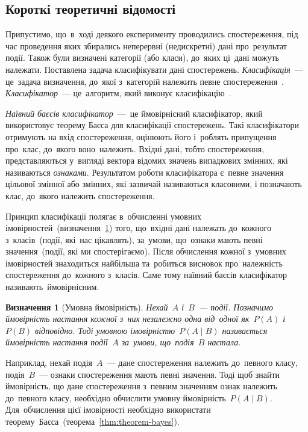 \documentclass[
	a4paper,
	oneside,
	DIV = 12,
	fontsize = 13pt,
	headings = normal,
	numbers = endperiod,
]{scrartcl}
\theoremstyle{mythm}
\newtheorem{mydef}{Визначення}
\begin{document}
		\subsection{Короткі теоретичні відомості}
			\label{ssec:theory-short}
			Припустимо, що~в~ході деякого експерименту проводились спостереження, під час проведення яких збирались неперервні (недискретні) дані про~результат події. Також були визначені категорії (або класи), до~яких ці~дані можуть належати. Поставлена задача класифікувати дані спостережень. \emph{Класифікація}~— це~задача визначення, до~якої з~категорій належить певне спостереження~\cite{wiki-stat-classification}. \emph{Класифікатор}~— це~алгоритм, який виконує класифікацію~\cite{wiki-stat-classification}.

			\emph{Наївний баєсів класифікатор}~— це ймовірнісний класифікатор, який використовує теорему Баєса для класифікації спостережень. Такі класифікатори отримують на вхід спостереження, оцінюють його і~роблять припущення про~клас, до~якого воно~належить. Вхідні дані, тобто спостереження, представляються у~вигляді вектора відомих значень випадкових змінних, які називаються \emph{ознаками}. Результатом роботи класифікатора є~певне значення цільової змінної або змінних, які зазвичай називаються класовими, і позначають клас, до~якого належить спостереження.

			Принцип класифікації полягає в~обчисленні умовних імовірностей~(визначення~\ref{def:conditional-probability}) того, що~вхідні дані належать до~кожного з~класів~(події, які~нас цікавлять), за~умови, що~ознаки мають певні значення~(події, які ми спостерігаємо). Після обчислення кожної з~умовних імовірностей знаходиться найбільша та~робиться висновок про~належність спостереження до~кожного з~класів. Саме тому наївний баєсів класифікатор називають~ймовірнісним.

			\begin{mydef}[Умовна ймовірність]
				\label{def:conditional-probability}
				Нехай~$A$ і~$B$~— події. Позначимо ймовірність настання кожної з~них незалежно одна від~одної як~$P(A)$ і~$P(B)$ відповідно. Тоді \emph{умовною імовірністю}~$P(A \mid B)$ називається ймовірність настання події~$A$ за~умови, що~подія~$B$ настала.
			\end{mydef}
			
			Наприклад, нехай подія~$A$~— дане спостереження належить до~певного класу, подія~$B$~— ознаки спостереження мають певні значення. Тоді щоб знайти ймовірність, що дане спостереження з~певним значенням ознак належить до~певного класу, необхідно обчислити умовну ймовірність~$P(A \mid B)$. Для~обчислення цієї імовірності необхідно використати теорему~Баєса~(теорема~\ref{thm:theorem-bayes}).
\end{document}
